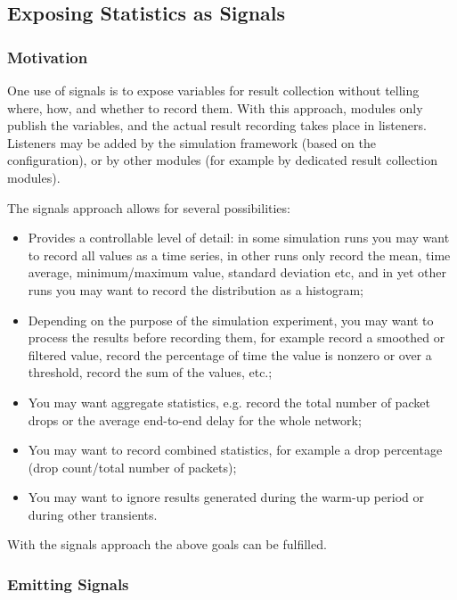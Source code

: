 \subsection{Exposing Statistics as Signals}
\label{sec:ch-simple-modules:statistic-signals}

\subsubsection{Motivation}

One use of signals is to expose variables for result collection without
telling where, how, and whether to record them. With this approach,
modules only publish the variables, and the actual result recording
takes place in listeners. Listeners may be added by the simulation
framework (based on the configuration), or by other modules (for example
by dedicated result collection modules).

The signals approach allows for several possibilities:

\begin{itemize}
 \item Provides a controllable level of detail: in some simulation runs
    you may want to record all values as a time series, in other runs
    only record the mean, time average, minimum/maximum value, standard
    deviation etc, and in yet other runs you may want to record the
    distribution as a histogram;
 \item Depending on the purpose of the simulation experiment, you may want
    to process the results before recording them, for example
    record a smoothed or filtered value, record the percentage of time the
    value is nonzero or over a threshold, record the sum of the values, etc.;
 \item You may want aggregate statistics, e.g. record the total number
    of packet drops or the average end-to-end delay for the whole network;
 \item You may want to record combined statistics, for example a drop
    percentage (drop count/total number of packets);
 \item You may want to ignore results generated during the warm-up period
    or during other transients.
\end{itemize}

With the signals approach the above goals can be fulfilled.


\subsubsection{Emitting Signals}

